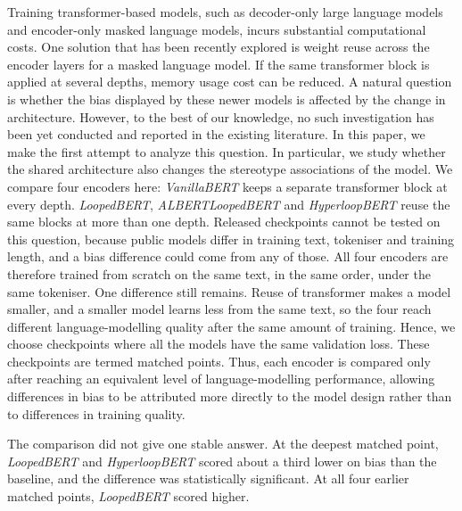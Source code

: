 \documentclass[sigconf,natbib=true,anonymous=true]{acmart}
\begin{document}
Training transformer-based models, such as decoder-only large language models and encoder-only masked language models, incurs substantial computational costs. One solution that has been recently explored is weight reuse across the encoder layers for a masked language model. If the same transformer block is applied at several depths, memory usage cost can be reduced. A natural question is whether the bias displayed by these newer models is affected by the change in architecture. However, to the best of our knowledge, no such investigation has been yet conducted and reported in the existing literature. In this paper, we make the first attempt to analyze this question. In particular, we study whether the shared architecture also changes the stereotype associations of the model. We compare four encoders here:
\emph{VanillaBERT} \citep{devlin2019bert} keeps a separate transformer block at
every depth. \emph{LoopedBERT}, \emph{ALBERTLoopedBERT} and \emph{HyperloopBERT}
reuse the same blocks at more than one depth. Released checkpoints cannot
be tested on this question, because public models differ in training text, tokeniser
and training length, and a bias difference could come from any of those. All
four encoders are therefore trained from scratch on the same text, in the same
order, under the same tokeniser. One difference still remains. Reuse of transformer makes a
model smaller, and a smaller model learns less from the same text, so the four
reach different language-modelling quality after the same amount of training.
Hence, we choose checkpoints where all the models have the same validation
loss. These checkpoints are termed matched points. Thus, each encoder is compared only after reaching an equivalent level of language-modelling performance, allowing differences in bias to be attributed more directly to the model design rather than to differences in training quality.

The comparison did not give one stable answer. At the deepest matched point,
\emph{LoopedBERT} and \emph{HyperloopBERT} scored about a third lower on bias
than the baseline, and the difference was statistically significant. At all
four earlier matched points, \emph{LoopedBERT} scored higher. 




\end{document}
